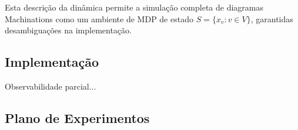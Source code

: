 \documentclass[10pt,a4paper]{article}
\begin{document}
Esta descrição da dinâmica permite a simulação completa de diagramas Machinations como um ambiente de MDP de estado $S = \{x_v : v \in V\}$, garantidas desambiguações na implementação.

\subsection{Implementação}
\label{m:mdp}
Observabilidade parcial...

\subsection{Plano de Experimentos}
\label{m:experiments}

\printbibliography
\end{document}

